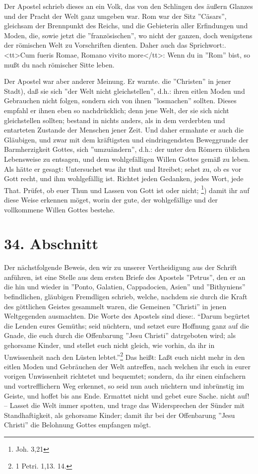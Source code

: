 Der Apostel schrieb dieses an ein Volk, das von den Schlingen des äußern Glanzes
und der Pracht der Welt ganz umgeben war. Rom war der Sitz ''Cäsars'', gleichsam
der Brennpunkt des Reichs, und die Gebieterin aller Erfindungen und Moden, die,
sowie jetzt die ''französischen'', wo nicht der ganzen, doch wenigstens der
römischen Welt zu Vorschriften dienten. Daher auch das Sprichwort:. <tt>Cum
fueris Romae, Romano vivito more</tt>: Wenn du in ''Rom'' bist, so mußt du nach
römischer Sitte leben.

Der Apostel war aber anderer Meinung. Er warnte. die ''Christen'' in jener
Stadt), daß sie sich ''der Welt nicht gleichstellen'', d.h.: ihren eitlen Moden
und Gebrauchen nicht folgen, sondern sich von ihnen ''losmachen'' sollten.
Dieses empfahl er ihnen eben so nachdrücklich; denn jene Welt, der sie sich
nicht gleichstellen sollten; bestand in nichts anders, als in dem verderbten und
entarteten Zustande der Menschen jener Zeit. Und daher ermahnte er auch die
Gläubigen, und zwar mit dem kräftigsten und eindringendsten Beweggrunde der
Barmherzigkeit Gottes, sich ''umzuändern'', d.h.: der unter den Römern üblichen
Lebensweise zu entsagen, und dem wohlgefälligen Willen Gottes gemäß zu leben.
Als hätte er gesagt: Untersuchet was ihr thut und Itreibet; sehet zu, ob es vor
Gott recht, und ihm wohlgefällig ist. Richtet jeden Gedanken, jedes Wort, jede
That. Prüfet, ob euer Thun und Lassen von Gott ist oder nicht; \footnote{Joh.
3,21}) damit ihr auf diese Weise erkennen möget, worin der gute, der
wohlgefällige und der vollkommene Willen Gottes bestehe.

\section{34. Abschnitt}

Der nächstfolgende Beweis, den wir zu unserer Vertheidigung aus der Schrift
anführen, ist eine Stelle aus dem ersten Briefe des Apostels ''Petrus'', den er
an die hin und wieder in ''Ponto, Galatien, Cappadocien, Asien'' und
''Bithyniens'' befindlichen, gläubigen Fremdligen schrieb, welche, nachdem sie
durch die Kraft des göttlichen Geistes gesammelt waren, die Gemeinen ''Christi''
in jenen Weltgegenden ausmachten. Die Worte des Apostels sind diese:. "`Darum
begürtet die Lenden eures Gemüths; seid nüchtern, und setzet eure Hoffnung ganz
auf die Gnade, die euch durch die Offenbarung ''Jesu Christi'' datrgeboten wird;
als gehorsame Kinder, und stellet euch nicht gleich, wie vorhin, da ihr in
Unwissenheit nach den Lüsten lebtet."'\footnote{1 Petri. 1,13. 14.} Das heißt:
Laßt euch nicht mehr in den eitlen Moden und Gebräuchen der Welt antreffen, nach
welchen ihr euch in eurer vorigen Unwissenheit richtetet und bequemtet; sondern,
da ihr einen einfachern und vortrefflichern Weg erkennet, so seid nun auch
nüchtern und inbrünstig im Geiste, und hoffet bis ans Ende. Ermattet nicht und
gebet eure Sache. nicht auf! -- Lasset die Welt immer spotten, und trage das
Widersprechen der Sünder mit Standhaftigkeit, als gehorsame Kinder; damit ihr
bei der Offenbarung ''Jesu Christi'' die Belohnung Gottes empfangen mögt.



